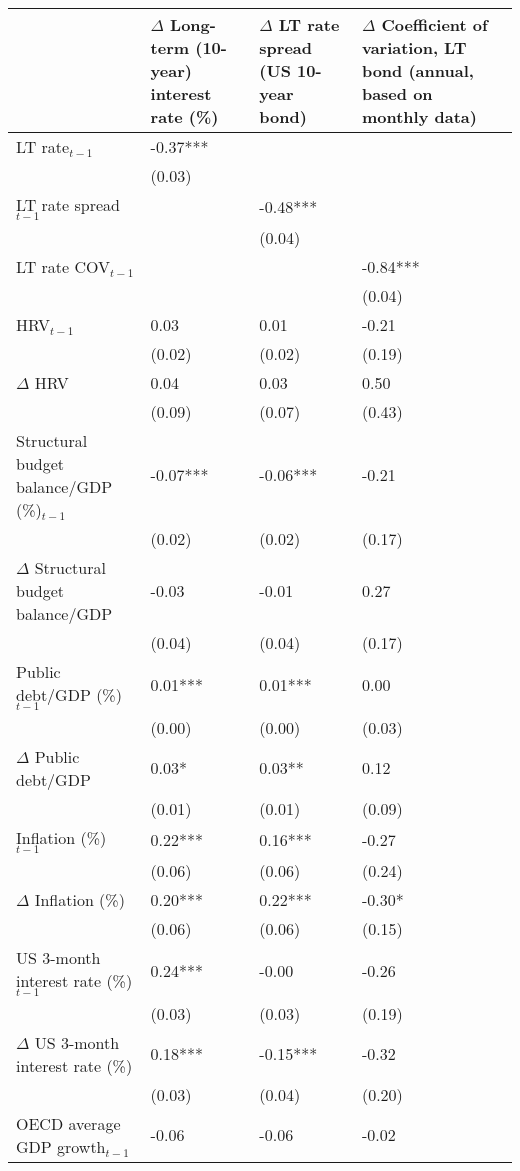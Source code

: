 {\tiny
\begin{tabular}{lp{2cm}p{2cm}p{2cm}}
  \hline
 & $\Delta$ Long-term (10-year) interest rate (\%) & $\Delta$ LT rate spread (US 10-year bond) & $\Delta$ Coefficient of variation, LT bond (annual, based on monthly data) \\ 
  \hline
LT rate$_{t-1}$ & -0.37*** &  &  \\ 
   & (0.03) &  &  \\ 
  LT rate spread$_{t-1}$ &  & -0.48*** &  \\ 
   &  & (0.04) &  \\ 
  LT rate COV$_{t-1}$ &  &  & -0.84*** \\ 
   &  &  & (0.04) \\ 
  HRV$_{t-1}$ & 0.03 & 0.01 & -0.21 \\ 
   & (0.02) & (0.02) & (0.19) \\ 
  $\Delta$ HRV & 0.04 & 0.03 & 0.50 \\ 
   & (0.09) & (0.07) & (0.43) \\ 
  Structural budget balance/GDP (\%)$_{t-1}$ & -0.07*** & -0.06*** & -0.21 \\ 
   & (0.02) & (0.02) & (0.17) \\ 
  $\Delta$ Structural budget balance/GDP & -0.03 & -0.01 & 0.27 \\ 
   & (0.04) & (0.04) & (0.17) \\ 
  Public debt/GDP (\%)$_{t-1}$ & 0.01*** & 0.01*** & 0.00 \\ 
   & (0.00) & (0.00) & (0.03) \\ 
  $\Delta$ Public debt/GDP & 0.03* & 0.03** & 0.12 \\ 
   & (0.01) & (0.01) & (0.09) \\ 
  Inflation (\%) $_{t-1}$ & 0.22*** & 0.16*** & -0.27 \\ 
   & (0.06) & (0.06) & (0.24) \\ 
  $\Delta$ Inflation (\%) & 0.20*** & 0.22*** & -0.30* \\ 
   & (0.06) & (0.06) & (0.15) \\ 
  US 3-month interest rate (\%)$_{t-1}$ & 0.24*** & -0.00 & -0.26 \\ 
   & (0.03) & (0.03) & (0.19) \\ 
  $\Delta$ US 3-month interest rate (\%) & 0.18*** & -0.15*** & -0.32 \\ 
   & (0.03) & (0.04) & (0.20) \\ 
  OECD average GDP growth$_{t-1}$ & -0.06 & -0.06 & -0.02 \\ 

\end{tabular}}
